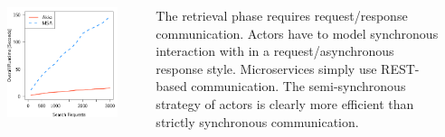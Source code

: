 \documentclass[final,hyperref={pdfpagelabels=true}]{beamer}
\begin{document}
\begin{frame}
\begin{columns}[t]
\begin{column}{.44\textwidth}
      \begin{columns}[t]
        \begin{column}{.4\textwidth}
          \begin{center}
          \includegraphics[width=1\textwidth]{graphics/eval-search-rtt-overall.pdf}
          \end{center}
        \end{column}
        \begin{column}{.08\textwidth}
        \end{column}
        \begin{column}{.52\textwidth}
          {\lmodern\justify
            \begin{justify}
            The retrieval phase requires request/response communication. Actors have to model synchronous interaction with in a request/asynchronous response style. Microservices simply use REST-based communication. The semi-synchronous strategy of actors is clearly more efficient than strictly synchronous communication.  
            \end{justify}
          }
        \end{column}
      \end{columns}
    \end{column}
    \begin{column}{.03\textwidth}
      \end{column}
  \end{columns}

\end{frame}
\end{document}
